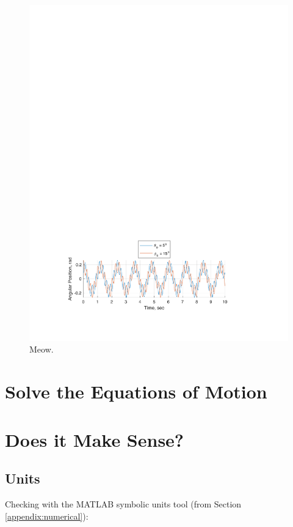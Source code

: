 \documentclass[12pt]{report}
\begin{document}
\begin{flushleft}
\begin{figure}[ht]
  \includegraphics[center]{3}
  \caption{Meow.}
  \label{fig:+05+15}
\end{figure}
\section{Solve the Equations of Motion}

\section{Does it Make Sense?}
\subsection{Units}
Checking with the MATLAB symbolic units tool (from Section \ref{appendix:numerical}): \\
~\\


\end{flushleft}
\end{document}
